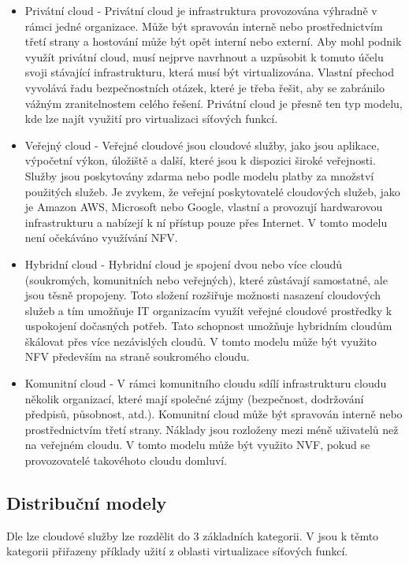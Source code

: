 \begin{itemize}
\item Privátní cloud - Privátní cloud je  infrastruktura  provozována  výhradně  v  rámci  jedné  organizace. Může být spravován interně nebo prostřednictvím třetí strany a hostování může být opět interní nebo externí.  Aby  mohl  podnik  využít  privátní  cloud,  musí  nejprve  navrhnout a uzpůsobit k tomuto účelu svoji stávající infrastrukturu, která musí být virtualizována.  Vlastní  přechod  vyvolává  řadu  bezpečnostních  otázek,  které  je třeba řešit, aby se zabránilo vážným zranitelnostem celého řešení. Privátní cloud je přesně ten typ modelu, kde lze najít využití pro virtualizaci síťových funkcí.
\item Veřejný cloud - Veřejné cloudové jsou cloudové služby, jako jsou aplikace, výpočetní výkon, úložiště a další, které jsou k dispozici široké  veřejnosti.  Služby  jsou  poskytovány  zdarma  nebo  podle modelu  platby  za  množství  použitých  služeb.  Je  zvykem,  že  veřejní  poskytovatelé cloudových  služeb,  jako  je  Amazon  AWS,  Microsoft  nebo  Google,  vlastní  a  provozují hardwarovou infrastrukturu a nabízejí k ní přístup pouze přes Internet. V tomto modelu není očekáváno využívání NFV.
\item Hybridní cloud - Hybridní  cloud je  spojení  dvou  nebo  více  cloudů  (soukromých,  komunitních  nebo veřejných),  které  zůstávají  samostatné,  ale  jsou  těsně  propojeny.  Toto  složení  rozšiřuje možnosti  nasazení  cloudových  služeb  a  tím  umožňuje  IT  organizacím  využít  veřejné cloudové prostředky k uspokojení dočasných potřeb. Tato schopnost umožňuje hybridním cloudům škálovat přes více nezávislých cloudů. V tomto modelu může být využito NFV především na straně soukromého cloudu.
\item Komunitní cloud - V rámci komunitního cloudu sdílí infrastrukturu cloudu několik organizací, které mají společné zájmy (bezpečnost, dodržování předpisů, působnost, atd.). Komunitní cloud může být spravován interně nebo prostřednictvím třetí strany. Náklady jsou rozloženy mezi méně uživatelů než na veřejném cloudu. V tomto modelu může být využito NVF, pokud se provozovatelé takovéhoto cloudu domluví. 
\end{itemize}

\subsection{Distribuční modely}

Dle \cite{CloudSurvey} lze cloudové služby lze rozdělit do 3 základních kategorii. V \cite{NFV_use_cases} jsou k těmto kategorii přiřazeny příklady užití z oblasti virtualizace síťových funkcí. 

